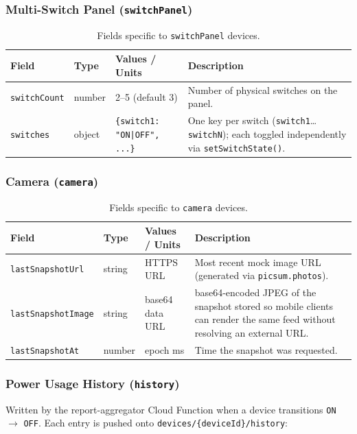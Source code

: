 \documentclass[11pt,a4paper]{article}
\begin{document}
\subsubsection{Multi-Switch Panel (\texttt{switchPanel})}
\begin{table}[H]
\centering
\caption{Fields specific to \texttt{switchPanel} devices.}
\begin{tabularx}{\textwidth}{@{}l l X X@{}}
\toprule
\textbf{Field} & \textbf{Type} & \textbf{Values / Units} & \textbf{Description} \\
\midrule
\texttt{switchCount} & number & 2--5 (default 3) & Number of physical switches on the panel. \\
\texttt{switches} & object & \texttt{\{switch1: "ON|OFF", ...\}} & One key per switch (\texttt{switch1}\dots\texttt{switchN}); each toggled independently via \texttt{setSwitchState()}. \\
\bottomrule
\end{tabularx}
\end{table}

\subsubsection{Camera (\texttt{camera})}
\begin{table}[H]
\centering
\caption{Fields specific to \texttt{camera} devices.}
\begin{tabularx}{\textwidth}{@{}l l X X@{}}
\toprule
\textbf{Field} & \textbf{Type} & \textbf{Values / Units} & \textbf{Description} \\
\midrule
\texttt{lastSnapshotUrl} & string & HTTPS URL & Most recent mock image URL (generated via \texttt{picsum.photos}). \\
\texttt{lastSnapshotImage} & string & base64 data URL & base64-encoded JPEG of the snapshot stored so mobile clients can render the same feed without resolving an external URL. \\
\texttt{lastSnapshotAt} & number & epoch ms & Time the snapshot was requested. \\
\bottomrule
\end{tabularx}
\end{table}

\subsubsection{Power Usage History (\texttt{history})}
Written by the report-aggregator Cloud Function when a device transitions \texttt{ON} $\rightarrow$ \texttt{OFF}.
Each entry is pushed onto \texttt{devices/\{deviceId\}/history}:
\end{document}
